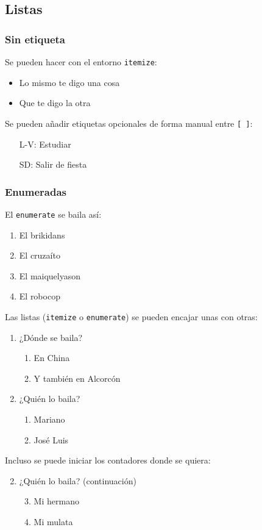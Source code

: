 \documentclass[12pt]{article}
\begin{document}
	\subsection{Listas}
	\subsubsection{Sin etiqueta}
	Se pueden hacer con el entorno \texttt{itemize}:
	\begin{itemize}
		\item Lo mismo te digo una cosa 
		\item Que te digo la otra
	\end{itemize}
	Se pueden añadir etiquetas opcionales de forma manual entre \texttt{[ ]}:
	\begin{itemize}
		\item[L-V:] Estudiar
		\item[SD:] Salir de fiesta
	\end{itemize}
	\subsubsection{Enumeradas}
	El \texttt{enumerate} se baila así:
	\begin{enumerate}
		\item El brikidans
		\item El cruzaíto
		\item El maiquelyason
		\item El robocop
	\end{enumerate}
	Las listas (\texttt{itemize} o \texttt{enumerate}) se pueden encajar unas con otras:
	\begin{enumerate}
		\item ¿Dónde se baila?
		\begin{enumerate}
			\item En China
			\item Y también en Alcorcón
		\end{enumerate}
		\item ¿Quién lo baila?
		\begin{enumerate}
			\item Mariano
			\item José Luis
		\end{enumerate}
	\end{enumerate}
	Incluso se puede iniciar los contadores donde se quiera:
	\begin{enumerate}
		\setcounter{enumi}{1}
		\item ¿Quién lo baila? (continuación)
		\begin{enumerate}
			\setcounter{enumii}{2}
			\item Mi hermano
			\item Mi mulata
		\end{enumerate}
	\end{enumerate}
\end{document}

